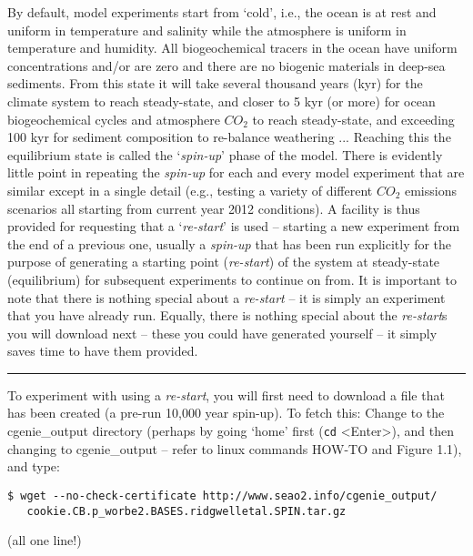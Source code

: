 By default, model experiments start from ‘cold’, i.e., the ocean is at rest and uniform in temperature and salinity while the atmosphere is uniform in temperature and humidity. All biogeochemical tracers in the ocean have uniform concentrations and/or are zero and there are no biogenic materials in deep-sea sediments. From this state it will take several thousand years (kyr) for the climate system to reach steady-state, and closer to 5 kyr (or more) for ocean biogeochemical cycles and atmosphere \(CO_{2}\) to reach steady-state, and exceeding 100 kyr for sediment composition to re-balance weathering ... Reaching this the equilibrium state is called the ‘\textit{spin-up}’ phase of the model.
There is evidently little point in repeating the \textit{spin-up} for each and every model experiment that are similar except in a single detail (e.g., testing a variety of different \(CO_{2}\) emissions scenarios all starting from current year 2012 conditions). A facility is thus provided for requesting that a ‘\textit{re-start}’ is used – starting a new experiment from the end of a previous one, usually a \textit{spin-up} that has been run explicitly for the purpose of generating a starting point (\textit{re-start}) of the system at steady-state (equilibrium) for subsequent experiments to continue on from.
It is important to note that there is nothing special about a \textit{re-start} – it is simply an experiment that you have already run. Equally, there is nothing special about the \textit{re-start}s you will download next – these you could have generated yourself – it simply saves time to have them provided.

\vspace{1mm}
\noindent\rule{4cm}{0.1mm}
\vspace{2mm}

\noindent To experiment with using a \textit{re-start}, you will first need to download a file that has been created (a pre-run 10,000 year spin-up). To fetch this: Change to the \textsf{\footnotesize cgenie\_output} directory (perhaps by going ‘home’ first (\texttt{cd} \textsf{\small <Enter>}), and then changing to \textsf{\footnotesize cgenie\_output} – refer to linux commands HOW-TO and Figure 1.1), and type:

\vspace{-2mm}\small
\begin{verbatim}
$ wget --no-check-certificate http://www.seao2.info/cgenie_output/
   cookie.CB.p_worbe2.BASES.ridgwelletal.SPIN.tar.gz
\end{verbatim}\normalsize
\vspace{-2mm}
(all one line!)

